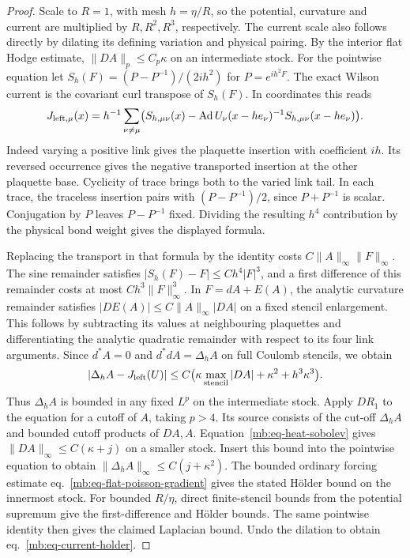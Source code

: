 \documentclass[11pt,letterpaper,reqno]{amsart}
\numberwithin{equation}{section}
\renewcommand{\eqref}[1]{\textup{eq.~\ref{#1}}}
\theoremstyle{definition}
\theoremstyle{remark}
\begin{document}
\begin{proof}
Scale to \(R=1\), with mesh \(h=\eta/R\), so the potential,
curvature and current are multiplied by \(R,R^2,R^3\),
respectively. The current scale also follows directly by
dilating its defining variation and physical pairing.
By the interior flat Hodge estimate, \(\|DA\|_p\le C_p\kappa\)
on an intermediate stock. For the pointwise equation let
\(S_h(F)=(P-P^{-1})/(2ih^2)\) for \(P=e^{ih^2F}\).
The exact Wilson current is the covariant curl transpose
of \(S_h(F)\). In coordinates this reads
\[
 J_{{\rm left},\mu}(x)
   =h^{-1}\sum_{\nu\ne\mu}
       \bigl(S_{h,\mu\nu}(x)-
         \operatorname{Ad}U_\nu(x-he_\nu)^{-1}
                    S_{h,\mu\nu}(x-he_\nu)\bigr).
\]
Indeed varying a positive link gives the plaquette insertion
with coefficient \(ih\). Its reversed occurrence gives the
negative transported insertion at the other plaquette base.
Cyclicity of trace brings both to the varied link tail.
In each trace, the traceless insertion pairs with
\((P-P^{-1})/2\), since \(P+P^{-1}\) is scalar.
Conjugation by \(P\) leaves \(P-P^{-1}\) fixed.
Dividing the resulting \(h^4\) contribution by the physical
bond weight gives the displayed formula.

Replacing the transport in that formula by the identity
costs \(C\|A\|_\infty\|F\|_\infty\).
The sine remainder satisfies
\(|S_h(F)-F|\le Ch^4|F|^3\), and a first difference of
this remainder costs at most \(Ch^3\|F\|_\infty^3\).
In \(F=dA+E(A)\), the analytic curvature remainder
satisfies \(|DE(A)|\le C\|A\|_\infty |DA|\) on a fixed
stencil enlargement. This follows by subtracting its
values at neighbouring plaquettes and differentiating the
analytic quadratic remainder with respect to its four link
arguments. Since \(d^*A=0\) and \(d^*dA=\Delta_h A\)
on full Coulomb stencils, we obtain
\[
 |\Delta_h A-J_{\rm left}(U)|
              \le C\bigl(\kappa\max_{\rm stencil}|DA|
                                   +\kappa^2+h^3\kappa^3\bigr).
\]
Thus \(\Delta_h A\) is bounded in any fixed \(L^p\) on the
intermediate stock. Apply \(D R_1\) to the equation for a
cutoff of \(A\), taking \(p>4\). Its source consists of the
cut-off \(\Delta_h A\) and bounded cutoff products of \(DA,A\).
Equation~\ref{mb:eq-heat-sobolev} gives
\(\|DA\|_\infty\le C(\kappa+j)\) on a smaller stock.
Insert this bound into the pointwise equation to obtain
\(\|\Delta_h A\|_\infty\le C(j+\kappa^2)\).
The bounded ordinary forcing estimate
\eqref{mb:eq-flat-poisson-gradient} gives the stated H\"older
bound on the innermost stock. For bounded \(R/\eta\), direct
finite-stencil bounds from the potential supremum give
the first-difference and H\"older bounds. The same pointwise
identity then gives the claimed Laplacian bound.
Undo the dilation to obtain \eqref{mb:eq-current-holder}.
\end{proof}
\end{document}
